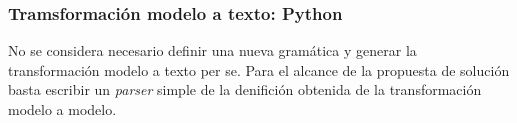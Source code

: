 \subsubsection*{Tramsformación modelo a texto: Python}

No se considera necesario definir una nueva gramática y generar la transformación modelo a texto per se. Para el alcance de la propuesta de solución basta escribir un \textit{parser} simple de la denifición obtenida de la transformación modelo a modelo.